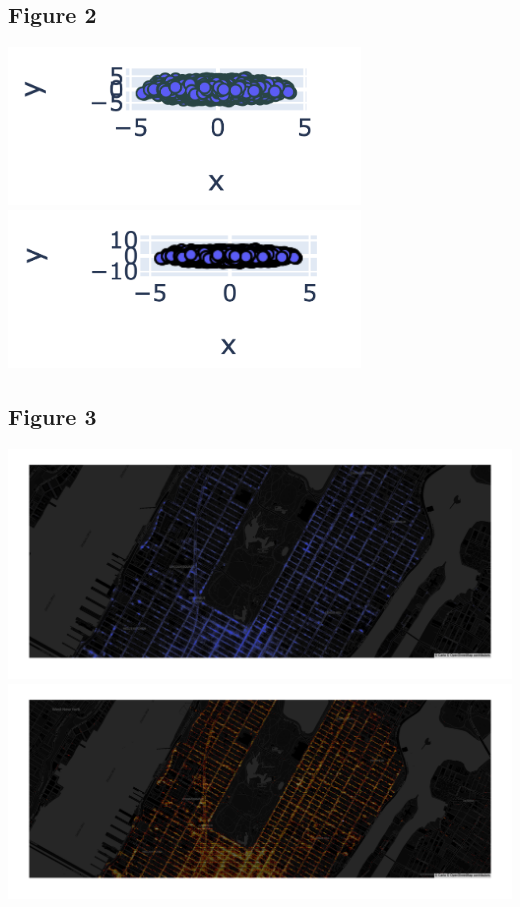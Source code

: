 \documentclass{article}
\begin{document}
\subsection{Figure 2}
\includegraphics[width=0.7\textwidth]{img/svg_quality.png}
\includegraphics[width=0.7\textwidth]{img/webgl_quality.png}

\subsection{Figure 3}
\includegraphics[width=1\textwidth]{img/newyork_plotly.png}
\includegraphics[width=1\textwidth]{img/newyork_datashader.png}
\end{document}
